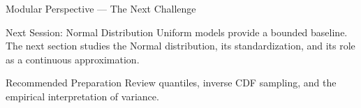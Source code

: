 \documentclass[aspectratio=169,xcolor={dvipsnames,table}]{beamer}
\begin{document}
\begin{frame}{Modular Perspective --- The Next Challenge}
\scriptsize
\begin{alertblock}{Next Session: Normal Distribution}
Uniform models provide a bounded baseline. The next section studies the Normal
distribution, its standardization, and its role as a continuous approximation.
\end{alertblock}
\begin{block}{Recommended Preparation}
Review quantiles, inverse CDF sampling, and the empirical interpretation of variance.
\end{block}
\end{frame}
\end{document}
